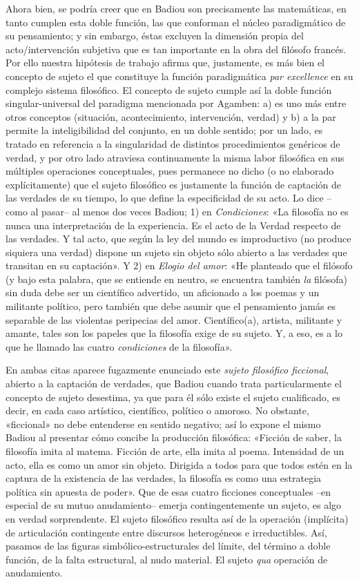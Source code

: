 Ahora bien, se podría creer que en Badiou son precisamente las matemáticas, en tanto cumplen esta doble función, las que conforman el núcleo paradigmático de su pensamiento; y sin embargo, éstas excluyen la dimensión propia del acto/intervención subjetiva que es tan importante en la obra del filósofo francés. Por ello nuestra hipótesis de trabajo afirma que, justamente, es más bien el concepto de sujeto el que constituye la función paradigmática \emph{par excellence} en su complejo sistema filosófico. El concepto de sujeto cumple así la doble función singular-universal del paradigma mencionada por Agamben: a) es uno más entre otros conceptos (situación, acontecimiento, intervención, verdad) y b) a la par permite la inteligibilidad del conjunto, en un doble sentido; por un lado, es tratado en referencia a la singularidad de distintos procedimientos genéricos de verdad, y por otro lado atraviesa continuamente la misma labor filosófica en sus múltiples operaciones conceptuales, pues permanece no dicho (o no elaborado explícitamente) que el sujeto filosófico es justamente la función de captación de las verdades de su tiempo, lo que define la especificidad de su acto. Lo dice --como al pasar-- al menos dos veces Badiou; 1) en \emph{Condiciones}: «La filosofía no es nunca una interpretación de la experiencia. Es el acto de la Verdad respecto de las verdades. Y tal acto, que según la ley del mundo es improductivo (no produce siquiera una verdad) dispone un sujeto sin objeto sólo abierto a las verdades que transitan en su captación». Y 2) en \emph{Elogio del amor}: «He planteado que el filósofo (y bajo esta palabra, que se entiende en neutro, se encuentra también \emph{la }filósofa) sin duda debe ser un científico advertido, un aficionado a los poemas y un militante político, pero también que debe asumir que el pensamiento jamás es separable de las violentas peripecias del amor. Científico(a), artista, militante y amante, tales son los papeles que la filosofía exige de su sujeto. Y, a eso, es a lo que he llamado las cuatro \emph{condiciones }de la filosofía».

En ambas citas aparece fugazmente enunciado este \emph{sujeto filosófico ficcional}, abierto a la captación de verdades, que Badiou cuando trata particularmente el concepto de sujeto desestima, ya que para él sólo existe el sujeto cualificado, es decir, en cada caso artístico, científico, político o amoroso. No obstante, «ficcional» no debe entenderse en sentido negativo; así lo expone el mismo Badiou al presentar cómo concibe la producción filosófica: «Ficción de saber, la filosofía imita al matema. Ficción de arte, ella imita al poema. Intensidad de un acto, ella es como un amor sin objeto. Dirigida a todos para que todos estén en la captura de la existencia de las verdades, la filosofía es como una estrategia política sin apuesta de poder». Que de esas cuatro ficciones conceptuales --en especial de su mutuo anudamiento-- emerja contingentemente un sujeto, es algo en verdad sorprendente. El sujeto filosófico resulta así de la operación (implícita) de articulación contingente entre discursos heterogéneos e irreductibles. Así, pasamos de las figuras simbólico-estructurales del límite, del término a doble función, de la falta estructural, al nudo material. El sujeto \emph{qua} operación de anudamiento.

